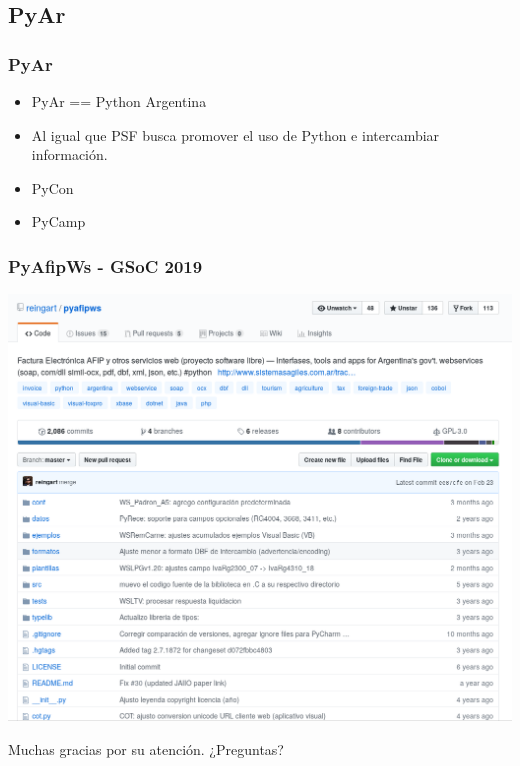 \documentclass[spanish]{beamer}
\begin{document}
\subsection{PyAr}
\begin{frame}
	\frametitle{PyAr}
	\begin{itemize}
		\item PyAr == Python Argentina
		\item Al igual que PSF busca promover el uso de Python
		e intercambiar información.
		\item PyCon
		\item PyCamp
	\end{itemize}
\end{frame}

\begin{frame}
	\frametitle{PyAfipWs - GSoC 2019}
	\center
	\includegraphics[width=1\linewidth]{pyafip.png}
\end{frame}

\begin{frame}
	\center
	{\LARGE Muchas gracias por su atención.}
	\newline
	\newline
	\newline
	¿Preguntas?
\end{frame}
\end{document}
